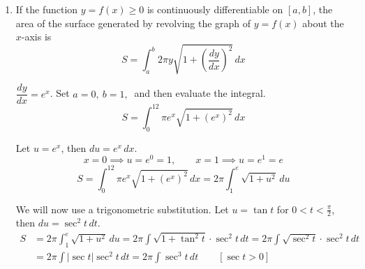 \documentclass[a4paper, 12pt]{article}
\begin{document}
\begin{enumerate}[leftmargin=*,label=\textbf{\arabic*.}]
Evaluate the first integral in \eqref{eq:17_18_summer_final_1}. Let $u=1+y$, then $du=dy$.
\[y=-1\implies u=0,\qquad y=0\implies u=1\]
\begin{align*}I_1&=\int_{-1}^0(4-y)\left(2\sqrt{1+y}\right)\,dy=2\int_0^1(5-u)\sqrt u\,du=10\int_0^1\sqrt u\,du-2\int_0^1u^{3/2}\,du\\[1em]&=\frac{20}3u^{3/2}-\frac45u^{5/2}\Bigg|_0^1=\frac{20}3-\frac45-0=\frac{88}{15}\end{align*}

Evaluate the second integral in \eqref{eq:17_18_summer_final_1}. Let $u=1+y$, then $du=dy$.
\[y=0\implies u=1,\qquad y=3\implies u=4\]
\begin{align*}I_2&=\int_0^3(4-y)\left(1+\sqrt{1+y}-y\right)\,dy=\int_1^4(5-u)\left(-u+2+\sqrt u\right)\,du\\[1em]&=\int_1^4\left(-7u+10+u^2+5\sqrt u-u^{3/2}\right)\,du=\left[-\frac{7u^2}2+10u+\frac{u^3}3+\frac{10}3u^{3/2}-\frac25u^{5/2}\right]_1^4\\[1em]&=\left[\left(-56+40+\frac{64}3+\frac{80}3-\frac{64}5\right)-\left(-\frac72+10+\frac13+\frac{10}3-\frac25\right)\right]=\frac{283}{30}\end{align*}

Therefore, the result is
\[2\pi\left(\frac{88}{15}+\frac{283}{30}\right)=\boxed{\frac{153\pi}5}\]

\item If the function $y=f(x)\geq0$ is continuously differentiable on $[a,b]$, the area of the surface generated by revolving the graph of $y=f(x)$ about the $x$-axis is
\[S=\int_a^b2\pi y\sqrt{1+\left(\frac{dy}{dx}\right)^2}\,dx\]

$\dfrac{dy}{dx}= e^x$. Set $a=0,\:b=1,\:$ and then evaluate the integral.
\[S=\int_0^12\pi e^x\sqrt{1+\left( e^x\right)^2}\,dx\]

Let $u= e^x$, then $du= e^x\,dx$.
\[x=0\implies u= e^0=1,\qquad x=1\implies u= e^1= e\]
\[S=\int_0^12\pi e^x\sqrt{1+\left( e^x\right)^2}\,dx=2\pi\int_1^{ e}\sqrt{1+u^2}\,du\]

We will now use a trigonometric substitution. Let $u=\tan t$ for $\displaystyle0<t<\frac\pi2$, then $du=\sec^2 t\,dt$.
\begin{align*}S&=2\pi\int_1^{ e}\sqrt{1+u^2}\,du=2\pi\int\sqrt{1+\tan^2t}\cdot\sec^2t\,dt=2\pi\int\sqrt{\sec^2t}\cdot\sec^2t\,dt\\[1em]&=2\pi\int\left|\sec t\right|\sec^2t\,dt=2\pi\int\sec^3t\,dt\qquad\left[\sec t>0\right]\end{align*}


\end{enumerate}
\end{document}

